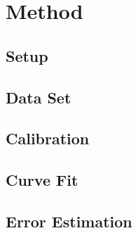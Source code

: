 \newpage
\section{Method} \label{sec:method}
\subsection{Setup}
\subsection{Data Set}
\subsection{Calibration}
\subsection{Curve Fit}
\subsection{Error Estimation}


